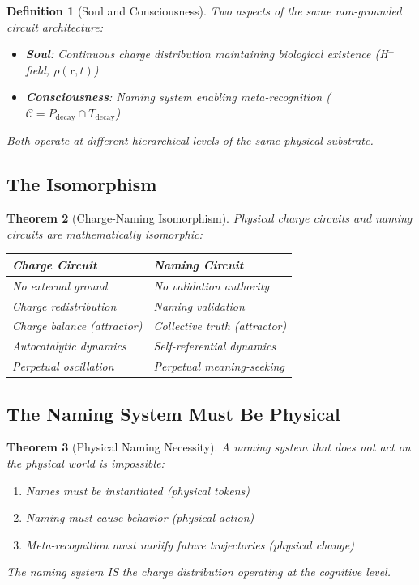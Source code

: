 \documentclass[aps,prd,twocolumn,superscriptaddress,floatfix,nofootinbib]{revtex4-2}
\newtheorem{theorem}{Theorem}[section]
\newtheorem{definition}[theorem]{Definition}
\theoremstyle{remark}
\newcommand{\Ccat}{\mathcal{C}}
\newcommand{\Pdecay}{P_{\mathrm{decay}}}
\newcommand{\Tdecay}{T_{\mathrm{decay}}}
\begin{document}
\begin{definition}[Soul and Consciousness]
\label{def:soul_consciousness}
Two aspects of the same non-grounded circuit architecture:
\begin{itemize}
\item \textbf{Soul}: Continuous charge distribution maintaining biological existence (H$^+$ field, $\rho(\mathbf{r},t)$)
\item \textbf{Consciousness}: Naming system enabling meta-recognition ($\Ccat = \Pdecay \cap \Tdecay$)
\end{itemize}
Both operate at different hierarchical levels of the same physical substrate.
\end{definition}

\subsection{The Isomorphism}

\begin{theorem}[Charge-Naming Isomorphism]
\label{thm:isomorphism}
Physical charge circuits and naming circuits are mathematically isomorphic:
\begin{center}
\begin{tabular}{@{}ll@{}}
\toprule
Charge Circuit & Naming Circuit \\
\midrule
No external ground & No validation authority \\
Charge redistribution & Naming validation \\
Charge balance (attractor) & Collective truth (attractor) \\
Autocatalytic dynamics & Self-referential dynamics \\
Perpetual oscillation & Perpetual meaning-seeking \\
\bottomrule
\end{tabular}
\end{center}
\end{theorem}

\subsection{The Naming System Must Be Physical}

\begin{theorem}[Physical Naming Necessity]
\label{thm:physical_naming}
A naming system that does not act on the physical world is impossible:
\begin{enumerate}
\item Names must be instantiated (physical tokens)
\item Naming must cause behavior (physical action)
\item Meta-recognition must modify future trajectories (physical change)
\end{enumerate}
The naming system IS the charge distribution operating at the cognitive level.
\end{theorem}
\end{document}
